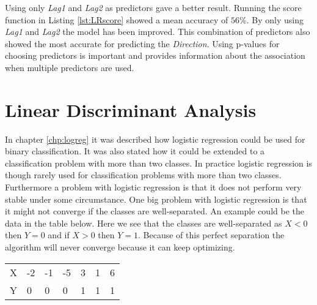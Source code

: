 Using only \emph{Lag1} and \emph{Lag2} as predictors gave a better result. Running the score function in Listing \ref{lst:LRscore} showed a mean accuracy of $56\%$. By only using \emph{Lag1} and \emph{Lag2} the model has been improved. This combination of predictors also showed the most accurate for predicting the \emph{Direction}. Using p-values for choosing predictors is important and provides information about the association when multiple predictors  are used.



\section{Linear Discriminant Analysis}
\label{chp:lindisana}

In chapter \ref{chp:logreg} it was described how logistic regression could be used for binary classification. It was also stated how it could be extended to  a classification problem with more than two classes. In practice logistic regression is though rarely used for classification problems with more than two classes. Furthermore a problem with logistic regression is that it does not perform very stable under some circumstance. One big problem with logistic regression is that it might not converge if the classes are well-separated. An example could be the data in the table below. Here we see that the classes are well-separated as $X<0$ then $Y=0$ and if $X>0$ then $Y=1$. Because of this perfect separation the algorithm will never converge because it can keep optimizing.

\begin{center} 
	\begin{tabular}{l|llllll}
		X & -2 & -1 & -5 & 3 & 1 & 6 \\[0.05cm] 
		Y &  0 &  0 &  0 & 1 & 1 & 1  \\[0.05cm] 
	\end{tabular}
\end{center}


